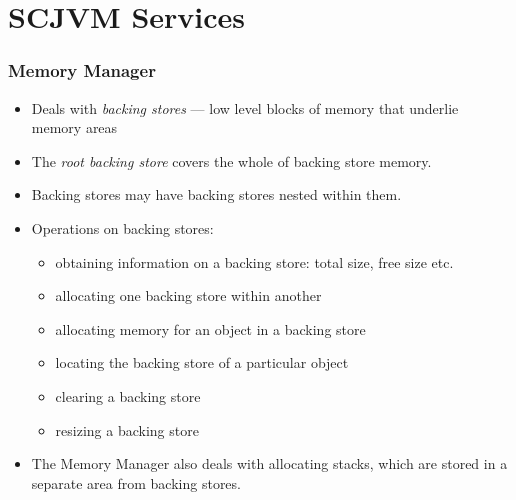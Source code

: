 \documentclass{beamer}
\begin{document}
\section{SCJVM Services}

\begin{frame}
  \frametitle{Memory Manager}
  \begin{itemize}
  \item Deals with \emph{backing stores} --- low level blocks of
    memory that underlie memory areas
  \item The \emph{root
      backing store} covers the whole of backing store memory.
  \item Backing stores may have backing stores nested within them.
  \item Operations on backing stores:
    \begin{itemize}
    \item obtaining information on a backing store: total size, free size etc.\
    \item allocating one backing store within another
    \item allocating memory for an object in a backing store
    \item locating the backing store of a particular object
    \item clearing a backing store
    \item resizing a backing store
    \end{itemize}
  \item The Memory Manager also deals with allocating stacks, which
    are stored in a separate area from backing stores.
  \end{itemize}
\end{frame}
\end{document}
